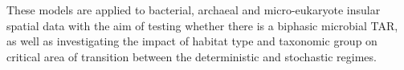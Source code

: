 \noindent These models are applied to bacterial, archaeal and micro-eukaryote insular spatial data with the aim of testing whether there is a biphasic microbial TAR, as well as investigating the impact of habitat type and taxonomic group on critical area of transition between the deterministic and stochastic regimes. 